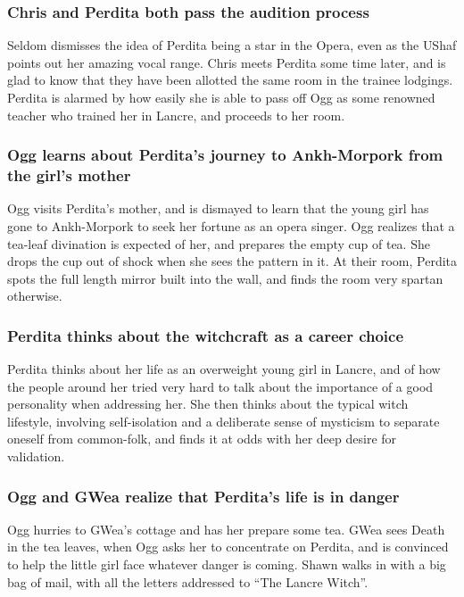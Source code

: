 \subsubsection{\Gls{Chris} and \Gls{Perdita} both pass the audition process}
\Gls{Seldom} dismisses the idea of \Gls{Perdita} being a star in the Opera, even as the \Gls{UShaf}
points out her amazing vocal range. \Gls{Chris} meets \Gls{Perdita} some time later, and is glad to
know that they have been allotted the same room in the trainee lodgings. \Gls{Perdita} is alarmed
by how easily she is able to pass off \Gls{Ogg} as some renowned teacher who trained her in Lancre,
and proceeds to her room.

\subsubsection{\Gls{Ogg} learns about \Gls{Perdita}'s journey to Ankh-Morpork from the girl's
    mother}
\Gls{Ogg} visits \Gls{Perdita}'s mother, and is dismayed to learn that the young girl has gone to
Ankh-Morpork to seek her fortune as an opera singer. \Gls{Ogg} realizes that a tea-leaf divination
is expected of her, and prepares the empty cup of tea. She drops the cup out of shock when she sees
the pattern in it. At their room, \Gls{Perdita} spots the full length mirror built into the wall,
and finds the room very spartan otherwise.

\subsubsection{\Gls{Perdita} thinks about the witchcraft as a career choice}
\Gls{Perdita} thinks about her life as an overweight young girl in Lancre, and of how the people
around her tried very hard to talk about the importance of a good personality when addressing her.
She then thinks about the typical witch lifestyle, involving self-isolation and a deliberate sense
of mysticism to separate oneself from common-folk, and finds it at odds with her deep desire for
validation.

\subsubsection{\Gls{Ogg} and \Gls{GWea} realize that \Gls{Perdita}'s life is in danger}
\Gls{Ogg} hurries to \Gls{GWea}'s cottage and has her prepare some tea. \Gls{GWea} sees \Gls{Death}
in the tea leaves, when \Gls{Ogg} asks her to concentrate on \Gls{Perdita}, and is convinced to
help the little girl face whatever danger is coming. \Gls{Shawn} walks in with a big bag of mail,
with all the letters addressed to ``The Lancre Witch''.

